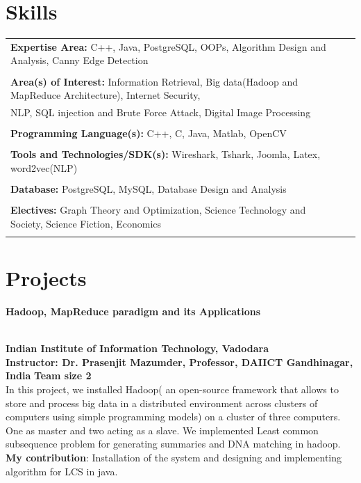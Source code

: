\documentclass{article}
\begin{document}
\section{Skills}
\begin{tabular}{ll}
\textbf{Expertise Area:} C++, Java, PostgreSQL, OOPs, Algorithm Design and Analysis, Canny Edge Detection \\ \\
\textbf{Area(s) of Interest:} Information Retrieval, Big data(Hadoop and MapReduce Architecture), Internet Security,\\ NLP, SQL injection and Brute Force Attack, Digital Image Processing \\ \\
\textbf{Programming Language(s):} C++, C, Java, Matlab, OpenCV\\ \\
\textbf{Tools and Technologies/SDK(s):} Wireshark, Tshark, Joomla, Latex, word2vec(NLP)  \\ \\
\textbf{Database:} PostgreSQL, MySQL, Database Design and Analysis\\ \\
\textbf{Electives:} Graph Theory and Optimization, Science Technology and Society, Science Fiction, Economics\\ \\
\end{tabular}


\section{Projects}
\begin{large}\textbf{Hadoop, MapReduce paradigm and its Applications }\end{large}\\
\textbf{Indian Institute of Information Technology, Vadodara}\\
\textbf{Instructor: Dr. Prasenjit Mazumder, Professor, DAIICT Gandhinagar, India}\hfill{} \textbf{Team size 2} \\
In this project, we installed  Hadoop( an open-source framework that allows to store and process big data in a distributed environment across clusters of computers using simple programming models) on a cluster of three computers. One as master and two acting as a slave. We implemented Least common subsequence problem for generating summaries and DNA matching in hadoop.  \\
\textbf{My contribution}: Installation of the system and designing and implementing algorithm for LCS in java.\\
\end{document}

